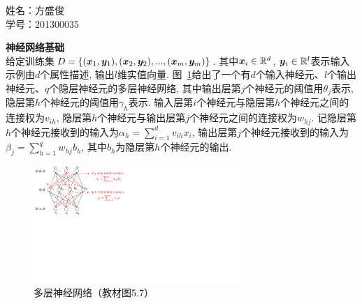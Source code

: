\documentclass[answers]{exam}  %
\begin{document}
\Large
\noindent
姓名：方盛俊 \\
学号：201300035 \\
\begin{questions}
  \question [20] \textbf{神经网络基础} \\

  给定训练集$D=\{({\boldsymbol{x}}_1, \boldsymbol{y}_1), ({\boldsymbol{x}}_2, \boldsymbol{y}_2), ..., ({\boldsymbol{x}}_m, \boldsymbol{y}_m)\}$. 其中${\boldsymbol{x}}_i \in \mathbb{R}^d$,
  $\boldsymbol{y}_i \in \mathbb{R}^l$表示输入示例由$d$个属性描述,
  输出$l$维实值向量.
  图~\ref{ch5_img:mlp}给出了一个有$d$个输入神经元、$l$个输出神经元、$q$个隐层神经元的多层神经网络, 其中输出层第$j$个神经元的阈值用$\theta_j$表示, 隐层第$h$个神经元的阈值用$\gamma_h$表示. 输入层第$i$个神经元与隐层第$h$个神经元之间的连接权为$v_{ih}$,
  隐层第$h$个神经元与输出层第$j$个神经元之间的连接权为$w_{hj}$.
  记隐层第$h$个神经元接收到的输入为$\alpha_h=\sum_{i=1}^d v_{ih}x_i$,
  输出层第$j$个神经元接收到的输入为$\beta_j=\sum_{h=1}^q w_{hj}b_h$,
  其中$b_h$为隐层第$h$个神经元的输出.
  \begin{figure}[ht]
    \centering
    \includegraphics[width=0.70\textwidth]{figure/ch5_nn.pdf}
    \caption{多层神经网络（教材图5.7）}\label{ch5_img:mlp}
  \end{figure}


\end{questions}
\end{document}
